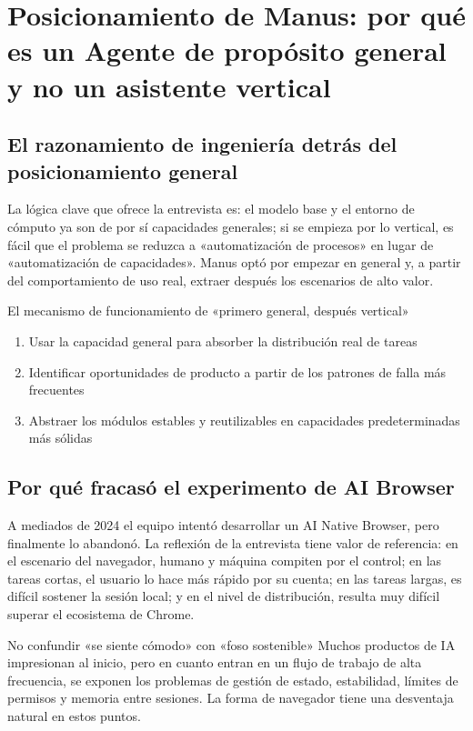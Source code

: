 \section{Posicionamiento de Manus: por qué es un Agente de propósito general y no un asistente vertical}

\subsection{El razonamiento de ingeniería detrás del posicionamiento general}

La lógica clave que ofrece la entrevista es: el modelo base y el entorno de cómputo ya son de por sí capacidades generales; si se empieza por lo vertical, es fácil que el problema se reduzca a «automatización de procesos» en lugar de «automatización de capacidades». Manus optó por empezar en general y, a partir del comportamiento de uso real, extraer después los escenarios de alto valor.

\begin{knowledgebox}{El mecanismo de funcionamiento de «primero general, después vertical»}
\begin{enumerate}
    \item Usar la capacidad general para absorber la distribución real de tareas
    \item Identificar oportunidades de producto a partir de los patrones de falla más frecuentes
    \item Abstraer los módulos estables y reutilizables en capacidades predeterminadas más sólidas
\end{enumerate}
\end{knowledgebox}

\subsection{Por qué fracasó el experimento de AI Browser}

A mediados de 2024 el equipo intentó desarrollar un AI Native Browser, pero finalmente lo abandonó. La reflexión de la entrevista tiene valor de referencia: en el escenario del navegador, humano y máquina compiten por el control; en las tareas cortas, el usuario lo hace más rápido por su cuenta; en las tareas largas, es difícil sostener la sesión local; y en el nivel de distribución, resulta muy difícil superar el ecosistema de Chrome.

\begin{warningbox}{No confundir «se siente cómodo» con «foso sostenible»}
Muchos productos de IA impresionan al inicio, pero en cuanto entran en un flujo de trabajo de alta frecuencia, se exponen los problemas de gestión de estado, estabilidad, límites de permisos y memoria entre sesiones. La forma de navegador tiene una desventaja natural en estos puntos.
\end{warningbox}

